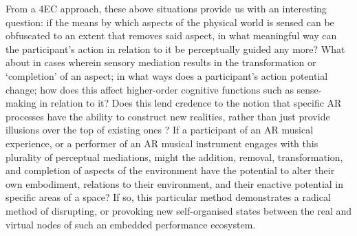 From a 4EC approach, these above situations provide us with an interesting question: if the means by which aspects of the physical world is sensed can be obfuscated to an extent that removes said aspect, in what meaningful way can the participant's action in relation to it be perceptually guided any more? What about in cases wherein sensory mediation results in the transformation or `completion' of an aspect; in what ways does a participant's action potential change; how does this affect higher-order cognitive functions such as sense-making in relation to it? Does this lend credence to the notion that specific AR processes have the ability to construct new realities, rather than just provide illusions over the top of existing ones \citep[p. 230]{chalmers2022}? If a participant of an AR musical experience, or a performer of an AR musical instrument engages with this plurality of perceptual mediations, might the addition, removal, transformation, and completion of aspects of the environment have the potential to alter their own embodiment, relations to their environment, and their enactive potential in specific areas of a space? If so, this particular method demonstrates a radical method of disrupting, or provoking new self-organised states between the real and virtual nodes of such an embedded performance ecosystem.
